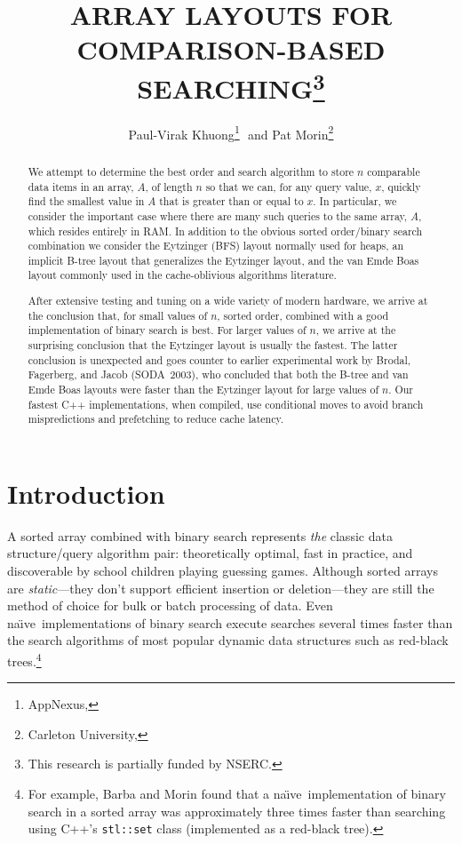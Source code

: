 \documentclass{patmorin}
\title{\MakeUppercase{Array Layouts for Comparison-Based Searching}\thanks{This research is partially funded by NSERC.}}
\author{Paul-Virak Khuong\footnote{AppNexus, \email{pvk@pvk.ca}}\,\, 
    and Pat Morin\footnote{Carleton University, \email{morin@scs.carleton.ca}}}
\newcommand{\naive}{na\"{\i}ve}
\begin{document}
\begin{titlepage}
\maketitle


\begin{abstract}
  We attempt to determine the best order and search algorithm to store
  $n$ comparable data items in an array, $A$, of length $n$ so that we
  can, for any query value, $x$, quickly find the smallest value in $A$
  that is greater than or equal to $x$. In particular, we consider the
  important case where there are many such queries to the same array,
  $A$, which resides entirely in RAM.  In addition to the obvious sorted
  order/binary search combination we consider the Eytzinger (BFS) layout
  normally used for heaps, an implicit B-tree layout that generalizes
  the Eytzinger layout, and the van Emde Boas layout commonly used in
  the cache-oblivious algorithms literature.

  After extensive testing and tuning on a wide variety of modern hardware,
  we arrive at the conclusion that, for small values of $n$, sorted
  order, combined with a good implementation of binary search is best.
  For larger values of $n$, we arrive at the surprising conclusion that
  the Eytzinger layout is usually the fastest. The latter conclusion is
  unexpected and goes counter to earlier experimental work by Brodal,
  Fagerberg, and Jacob (SODA~2003), who concluded that both the B-tree
  and van Emde Boas layouts were faster than the Eytzinger layout for
  large values of $n$.  Our fastest C++ implementations, when compiled,
  use conditional moves to avoid branch mispredictions and prefetching
  to reduce cache latency.
\end{abstract}

\end{titlepage}

\tableofcontents
\newpage

\section{Introduction}

A sorted array combined with binary search represents \emph{the} classic
data structure/query algorithm pair: theoretically optimal, fast in
practice, and discoverable by school children playing guessing games.
Although sorted arrays are \emph{static}---they don't support efficient
insertion or deletion---they are still the method of choice for bulk or
batch processing of data. Even \naive\ implementations of binary search
execute searches several times faster than the search algorithms of most
popular dynamic data structures such as red-black trees.\footnote{For
example, Barba and Morin \cite{barba.morin:top-down} found that a \naive\
implementation of binary search in a sorted array was approximately
three times faster than searching using C++'s \texttt{stl::set} class
(implemented as a red-black tree).}
\end{document}
